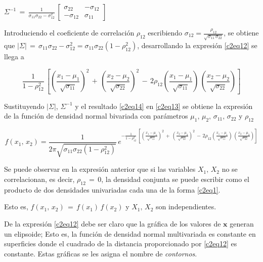 \documentclass[english]{report}
\begin{document}
$\Sigma^{-1}\,=\,\frac{1}{\sigma_{11}\sigma_{22}-\sigma^2_{12}}\,\begin{bmatrix}
\sigma_{22}&-\sigma_{12}\\
-\sigma_{12}&\sigma_{11}
\end{bmatrix}$


Introduciendo el coeficiente de correlación $\rho_{12}$ escribiendo $\sigma_{12}=\frac{\rho_{12}}{\sqrt{\sigma_{11}\,\sigma_{22}}}$, se obtiene que $|\Sigma|\,=\,\sigma_{11}\sigma_{22}-\sigma^2_{12}=\sigma_{11}\sigma_{22}(1-\rho^2_{12})$, desarrollando la expresión \ref{c2eq12}  se llega a

\begin{equation}
\frac{1}{1-\rho^2_{12}}\,\left[\left(\frac{x_1-\mu_1}{\sqrt{\sigma_{11}}}\right)^2\,+\,\left(\frac{x_2-\mu_2}{\sqrt{\sigma_{22}}}\right)^2\,-\,2\rho_{12}\left(\frac{x_1-\mu_1}{\sqrt{\sigma_{11}}}\right)\,\left(\frac{x_2-\mu_2}{\sqrt{\sigma_{22}}}\right)\right]
\label{c2eq14}
\end{equation}

Sustituyendo $|\Sigma|$, $\Sigma^{-1}$ y el resultado \ref{c2eq14} en \ref{c2eq13} se obtiene la expresión de la función de densidad normal bivariada con parámetros $\mu_1,\,\mu_2,\,\sigma_{11},\,\sigma_{22}$ y $\rho_{12}$

\begin{equation}
f(x_1,\,x_2)= \frac{1}{2\pi\sqrt{\sigma_{11}\sigma_{22}(1-\rho^2_{12})}}\,e^{-\frac{1}{1-\rho^2_{12}}\,\left[\left(\frac{x_1-\mu_1}{\sqrt{\sigma_{11}}}\right)^2\,+\,\left(\frac{x_2-\mu_2}{\sqrt{\sigma_{22}}}\right)^2\,-\,2\rho_{12}\left(\frac{x_1-\mu_1}{\sqrt{\sigma_{11}}}\right)\,\left(\frac{x_2-\mu_2}{\sqrt{\sigma_{22}}}\right)\right]}
\label{c2eq15}
\end{equation}

Se puede observar en la expresión anterior que si las variables $X_1,\,X_2$ no se correlacionan, es decir, $\rho_{12}\,=\,0$, la densidad conjunta se puede escribir como el producto de dos densidades univariadas cada una de la forma \ref{c2eq1}.

Esto es, $f(x_1,\,x_2)\,=\,f(x_1)\,f(x_2)$ y $X_1,\,X_2$ son independientes.

De la expresión \ref{c2eq12} debe ser claro que la gráfica de los valores de $\textbf{x}$ generan un elipsoide; Esto es, la función de densidad normal multivariada es constante en superficies donde el cuadrado de la distancia proporcionado por \ref{c2eq12} es constante. Estas gráficas se les asigna el nombre de \emph{contornos}.
\end{document}
